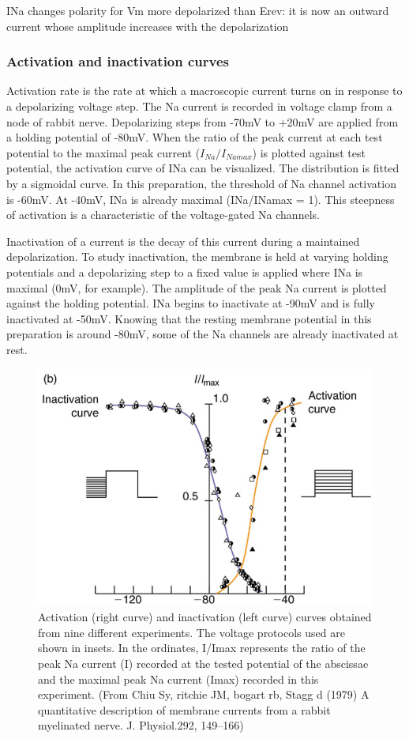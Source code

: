 \documentclass[../../Orator]{subfiles}
\begin{document}
INa changes polarity for Vm more depolarized than Erev: it is now an outward current whose amplitude increases with the depolarization 

\subsubsection{Activation and inactivation curves }
Activation rate is the rate at which a macroscopic current turns on in response to a depolarizing voltage step. The \gls{Na} current is recorded in voltage clamp from a node of rabbit nerve. Depolarizing steps from -70mV to +20mV are applied from a holding potential of -80mV. When the ratio of the peak current at each test potential to the maximal peak current (\(I_{Na}/I_{Namax}\)) is plotted against test potential, the activation curve of INa can be visualized. The distribution is fitted by a sigmoidal curve. In this preparation, the threshold of \gls{Na} channel activation is -60mV. At -40mV, INa is already maximal (INa/INamax = 1). This steepness of activation is a characteristic of the voltage-gated \gls{Na} channels. 

Inactivation of a current is the decay of this current during a maintained depolarization. To study inactivation, the membrane is held at varying holding potentials and a depolarizing step to a fixed value is applied where INa is maximal (0mV, for example). The amplitude of the peak \gls{Na} current is plotted against the holding potential. INa begins to inactivate at -90mV and is fully inactivated at -50mV. Knowing that the resting membrane potential in this preparation is around -80mV, some of the \gls{Na} channels are already inactivated at rest. 
\begin{figure}[H]
    \centering
    \includegraphics[width=0.5\linewidth]{Pictures//Anakin/activ-inactiv.png}
    \caption{Activation (right curve) and inactivation (left curve) curves obtained from nine different experiments. The voltage protocols used are shown in insets. In the ordinates, I/Imax represents the ratio of the peak \gls{Na} current (I) recorded at the tested potential of the abscissae and the maximal peak \gls{Na} current (Imax) recorded in this experiment. (From Chiu Sy, ritchie JM, bogart rb, Stagg d (1979) A quantitative description of membrane currents from a rabbit myelinated nerve. J. Physiol.292, 149–166) }
    \label{fig:enter-label}
\end{figure}
\end{document}
